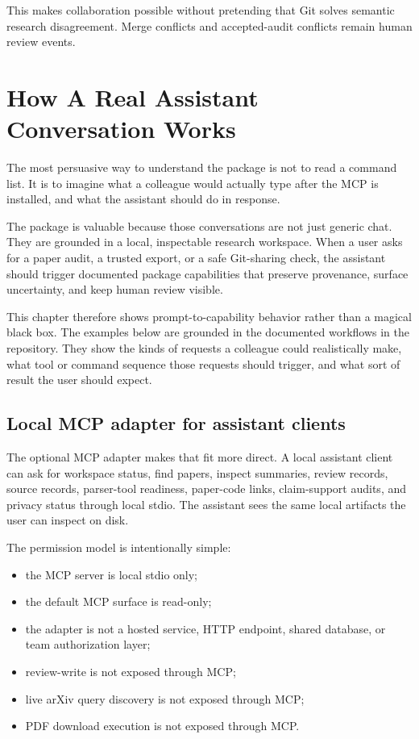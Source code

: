 \documentclass[11pt,a4paper,openany]{book}
\begin{document}
This makes collaboration possible without pretending that Git solves semantic
research disagreement. Merge conflicts and accepted-audit conflicts remain human
review events.

\chapter{How A Real Assistant Conversation Works}

The most persuasive way to understand the package is not to read a command list.
It is to imagine what a colleague would actually type after the MCP is installed,
and what the assistant should do in response.

The package is valuable because those conversations are not just generic chat.
They are grounded in a local, inspectable research workspace. When a user asks
for a paper audit, a trusted export, or a safe Git-sharing check, the assistant
should trigger documented package capabilities that preserve provenance, surface
uncertainty, and keep human review visible.

This chapter therefore shows prompt-to-capability behavior rather than a magical
black box. The examples below are grounded in the documented workflows in the
repository. They show the kinds of requests a colleague could realistically make,
what tool or command sequence those requests should trigger, and what sort of
result the user should expect.

\section{Local MCP adapter for assistant clients}

The optional MCP adapter makes that fit more direct. A local assistant client can
ask for workspace status, find papers, inspect summaries, review records, source
records, parser-tool readiness, paper-code links, claim-support audits, and
privacy status through local stdio. The assistant sees the same local artifacts
the user can inspect on disk.

The permission model is intentionally simple:
\begin{itemize}[nosep]
  \item the MCP server is local stdio only;
  \item the default MCP surface is read-only;
  \item the adapter is not a hosted service, HTTP endpoint, shared database, or
        team authorization layer;
  \item review-write is not exposed through MCP;
  \item live arXiv query discovery is not exposed through MCP;
  \item PDF download execution is not exposed through MCP.
\end{itemize}
\end{document}
